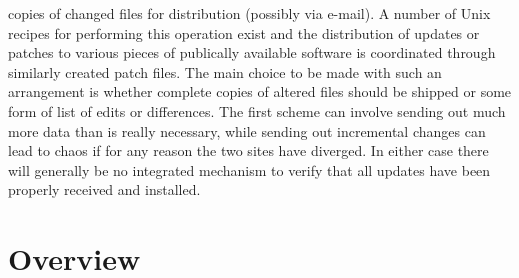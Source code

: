 \begin{description}
copies of changed files for distribution (possibly via e-mail). A number of
Unix recipes for performing this operation exist and the distribution of
updates or patches to various pieces of publically available software is
coordinated through similarly created patch files.  The main choice to be
made with such an arrangement is whether complete copies of altered files
should be shipped or some form of list of edits or differences.  The first
scheme can involve sending out much more data than is really necessary, while
sending out incremental changes can lead to chaos if for any reason the
two sites have diverged. In either case there will generally be no integrated
mechanism to verify that all updates have been properly received and
installed.
\end{description}

\section{Overview}

